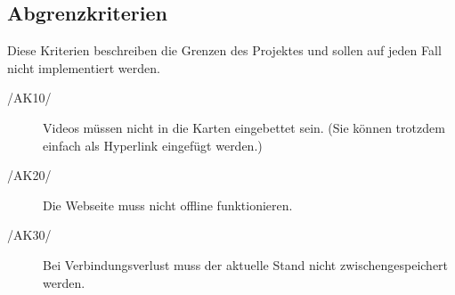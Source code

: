 \subsection{Abgrenzkriterien}
Diese Kriterien beschreiben die Grenzen des Projektes und sollen auf jeden Fall nicht implementiert werden.
\begin{description}
	\item[/AK10/] Videos müssen nicht in die Karten eingebettet sein. (Sie können trotzdem einfach als Hyperlink eingefügt werden.)
	\item[/AK20/] Die Webseite muss nicht offline funktionieren.
	\item[/AK30/] Bei Verbindungsverlust muss der aktuelle Stand nicht zwischengespeichert werden.
\end{description}